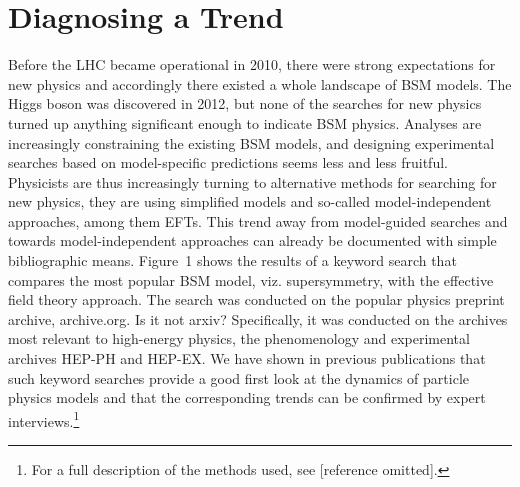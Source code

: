 \section{Diagnosing a Trend} \label{sec:data}
Before the LHC became operational in 2010, there were strong expectations for new physics and accordingly there existed a whole landscape of BSM models. 
The Higgs boson was discovered in 2012, but none of the searches for new physics turned up anything significant enough to indicate BSM physics.
Analyses are increasingly constraining the existing BSM models, and designing experimental searches based on model-specific predictions seems less and less fruitful. 
Physicists are thus increasingly turning to alternative methods for searching for new physics, they are using simplified models and so-called model-independent approaches, among them EFTs.
This trend away from model-guided searches and towards model-independent approaches can already be documented with simple bibliographic means.
Figure~1 shows the results of a keyword search that compares the most popular BSM model, viz. supersymmetry, with the effective field theory approach. 
The search was conducted on the popular physics preprint archive, archive.org. {\MSnote Is it not arxiv?}
Specifically, it was conducted on the archives most relevant to high-energy physics, the phenomenology and experimental archives HEP-PH and HEP-EX. 
We have shown in previous publications that such keyword searches provide a good first look at the dynamics of particle physics models and that the corresponding trends can be confirmed by expert interviews.\footnote{For a full description of the methods used, see [reference omitted].}

